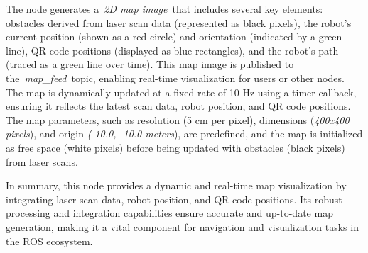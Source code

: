 \documentclass[../../main]{subfiles}
\begin{document}
The node generates a~\emph{2D map image}~that includes several key
elements: obstacles derived from laser scan data (represented as black
pixels), the robot's current position (shown as a red circle) and
orientation (indicated by a green line), QR code positions (displayed as
blue rectangles), and the robot's path (traced as a green line over
time). This map image is published to the~\emph{map\_feed}~topic,
enabling real-time visualization for users or other nodes. The map is
dynamically updated at a fixed rate of 10 Hz using a timer callback,
ensuring it reflects the latest scan data, robot position, and QR code
positions. The map parameters, such as resolution (5 cm per pixel),
dimensions (\emph{400x400 pixels}), and origin \emph{(-10.0, -10.0
meters}), are predefined, and the map is initialized as free space
(white pixels) before being updated with obstacles (black pixels) from
laser scans.

In summary, this node provides a dynamic and real-time map visualization
by integrating laser scan data, robot position, and QR code positions.
Its robust processing and integration capabilities ensure accurate and
up-to-date map generation, making it a vital component for navigation
and visualization tasks in the ROS ecosystem.
\end{document}
